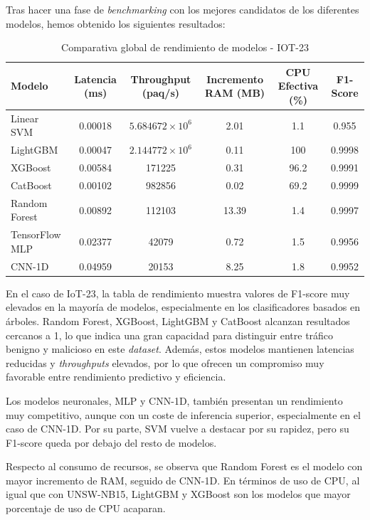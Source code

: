 Tras hacer una fase de \textit{benchmarking} con los mejores candidatos de los diferentes modelos, hemos obtenido los siguientes resultados:

\begin{table}[H]
    \centering
    \small
    \begin{tabular}{|l|c|c|c|c|c|}
        \hline
        \textbf{Modelo} & \textbf{Latencia (ms)} & \textbf{Throughput (paq/s)} & \textbf{Incremento RAM (MB)} & \textbf{CPU Efectiva (\%)} & \textbf{F1-Score} \\
        \hline
        Linear SVM & 0.00018 & $5.684672 \times 10^{6}$ & 2.01 & 1.1 & 0.955 \\
        \hline
        LightGBM & 0.00047 & $2.144772 \times 10^{6}$ & 0.11 & 100 & 0.9998 \\
        \hline
        XGBoost & 0.00584 & 171225 & 0.31 & 96.2 & 0.9991 \\
        \hline
        CatBoost & 0.00102 & 982856 & 0.02 & 69.2 & 0.9999 \\
        \hline
        Random Forest & 0.00892 & 112103 & 13.39 & 1.4 & 0.9997 \\
        \hline
        TensorFlow MLP & 0.02377 & 42079 & 0.72 & 1.5 & 0.9956 \\
        \hline
        CNN-1D & 0.04959 & 20153 & 8.25 & 1.8 & 0.9952 \\
        \hline
    \end{tabular}
    \caption{Comparativa global de rendimiento de modelos - IOT-23}
    \label{tab:hardware_benchmark_global_iot23}
\end{table}

En el caso de IoT-23, la tabla de rendimiento muestra valores de F1-score muy elevados en la mayoría de modelos, especialmente en los clasificadores basados en árboles. Random Forest, XGBoost, LightGBM y CatBoost alcanzan resultados cercanos a 1, lo que indica una gran capacidad para distinguir entre tráfico benigno y malicioso en este \textit{dataset}. Además, estos modelos mantienen latencias reducidas y \textit{throughputs} elevados, por lo que ofrecen un compromiso muy favorable entre rendimiento predictivo y eficiencia.

Los modelos neuronales, MLP y CNN-1D, también presentan un rendimiento muy competitivo, aunque con un coste de inferencia superior, especialmente en el caso de CNN-1D. Por su parte, SVM vuelve a destacar por su rapidez, pero su F1-score queda por debajo del resto de modelos.

Respecto al consumo de recursos, se observa que Random Forest es el modelo con mayor incremento de RAM, seguido de CNN-1D. En términos de uso de CPU, al igual que con UNSW-NB15, LightGBM y XGBoost son los modelos que mayor porcentaje de uso de CPU acaparan.


